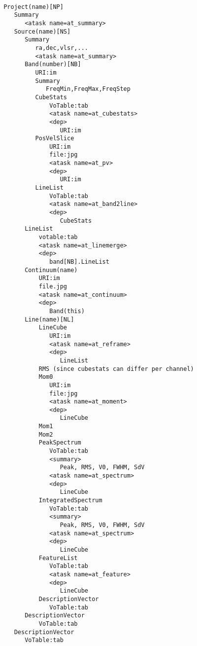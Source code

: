 \documentclass{article}
\begin{document}
\newpage

\footnotesize
\begin{verbatim}

 Project(name)[NP]
    Summary
       <atask name=at_summary>
    Source(name)[NS]
       Summary
          ra,dec,vlsr,...
          <atask name=at_summary>
       Band(number)[NB]
          URI:im
          Summary
             FreqMin,FreqMax,FreqStep
          CubeStats
              VoTable:tab
              <atask name=at_cubestats>
              <dep>
                 URI:im
          PosVelSlice
              URI:im
              file:jpg
              <atask name=at_pv>
              <dep>
                 URI:im
          LineList
              VoTable:tab
              <atask name=at_band2line>
              <dep>
                 CubeStats
       LineList
           votable:tab
           <atask name=at_linemerge>
           <dep>
              band[NB].LineList
       Continuum(name)
           URI:im
           file.jpg
           <atask name=at_continuum>
           <dep>
              Band(this)
       Line(name)[NL]
           LineCube
              URI:im
              <atask name=at_reframe>
              <dep>
                 LineList
           RMS (since cubestats can differ per channel)
           Mom0
              URI:im
              file:jpg
              <atask name=at_moment>
              <dep>
                 LineCube
           Mom1
           Mom2
           PeakSpectrum
              VoTable:tab
              <summary>
                 Peak, RMS, V0, FWHM, SdV
              <atask name=at_spectrum>
              <dep>
                 LineCube
           IntegratedSpectrum
              VoTable:tab
              <summary>
                 Peak, RMS, V0, FWHM, SdV
              <atask name=at_spectrum>
              <dep>
                 LineCube
           FeatureList
              VoTable:tab
              <atask name=at_feature>
              <dep>
                 LineCube 
           DescriptionVector
              VoTable:tab
       DescriptionVector
           VoTable:tab
    DescriptionVector
       VoTable:tab

\end{verbatim}
\normalsize


%

%
%
%
%
%
%
%
%
%        
\end{document}
